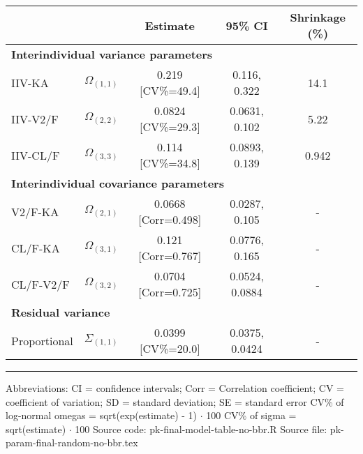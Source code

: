 \setlength{\tabcolsep}{5pt} 
\begin{threeparttable}
\renewcommand{\arraystretch}{1.3}
\begin{tabular}[h]{lcccc}
\hline
 &  & Estimate & 95\% CI & Shrinkage (\%) \\
\hline
\multicolumn{5}{l}{\textbf{Interindividual variance parameters}}\\%
IIV-KA & $\Omega_{(1,1)}$ & 0.219 [CV\%=49.4] & 0.116, 0.322 & 14.1 \\
IIV-V2/F & $\Omega_{(2,2)}$ & 0.0824 [CV\%=29.3] & 0.0631, 0.102 & 5.22 \\
IIV-CL/F & $\Omega_{(3,3)}$ & 0.114 [CV\%=34.8] & 0.0893, 0.139 & 0.942 \\
\hline \multicolumn{5}{l}{\textbf{Interindividual covariance parameters}}\\%
V2/F-KA & $\Omega_{(2,1)}$ & 0.0668 [Corr=0.498] & 0.0287, 0.105 & - \\
CL/F-KA & $\Omega_{(3,1)}$ & 0.121 [Corr=0.767] & 0.0776, 0.165 & - \\
CL/F-V2/F & $\Omega_{(3,2)}$ & 0.0704 [Corr=0.725] & 0.0524, 0.0884 & - \\
\hline \multicolumn{5}{l}{\textbf{Residual variance}}\\%
Proportional & $\Sigma_{(1,1)}$ & 0.0399 [CV\%=20.0] & 0.0375, 0.0424 & - \\
\hline
\end{tabular}
\end{threeparttable}
 
\vspace{0.67cm}
 
\begin{minipage}{1\linewidth}
\linespread{1.1}\selectfont
\rule{1\linewidth}{0.4pt}
\vspace{0.02cm}
Abbreviations: CI = confidence intervals; 
                        Corr = Correlation coefficient;
                        CV = coefficient of variation;
                        SD = standard deviation;
                        SE = standard error \newline
CV\% of log-normal omegas = sqrt(exp(estimate) - 1) $\cdot$ 100 \newline
CV\% of sigma = sqrt(estimate) $\cdot$ 100 \newline
Source code: pk-final-model-table-no-bbr.R \newline
Source file: pk-param-final-random-no-bbr.tex \newline
\end{minipage}

